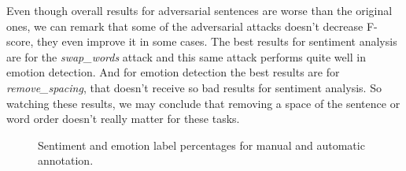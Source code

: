\documentclass[11pt,a4paper]{article}
\begin{document}
Even though overall results for adversarial sentences are worse than the original ones, we can remark that some of the adversarial attacks doesn't decrease F-score, they even improve it in some cases. The best results for sentiment analysis are for the \textit{swap\_words} attack and this same attack performs quite well in emotion detection. And for emotion detection the best results are for \textit{remove\_spacing}, that doesn't receive so bad results for sentiment analysis. So watching these results, we may conclude that removing a space of the sentence or word order doesn't really matter for these tasks.

\begin{figure}[ht]
    \centering
    \caption{Sentiment and emotion label percentages for manual and automatic annotation.}
    \label{fig:pieplots_sentiment_emotion}
\end{figure}
\end{document}
